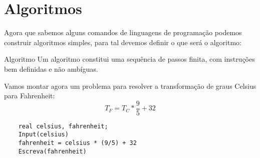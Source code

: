 \section{Algoritmos}
Agora que sabemos alguns comandos de linguagens de programação podemos construir algoritmos simples, para tal devemos definir o que será o algoritmo: \\
\begin{definicao}{Algoritmo}
    Um algoritmo constitui uma sequência de passos finita, com instruções bem definidas e não ambíguas.
\end{definicao}
Vamos montar agora um problema para resolver a transformação de graus Celsius para Fahrenheit:
\begin{equation}
    T_{F} = T_{C} * \frac{9}{5} + 32
\end{equation}

\begin{lstlisting}
    real celsius, fahrenheit;
    Input(celsius)
    fahrenheit = celsius * (9/5) + 32
    Escreva(fahrenheit)
\end{lstlisting}